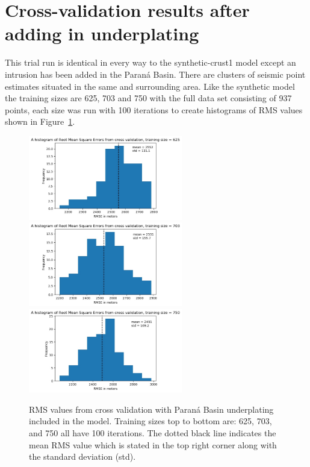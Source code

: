\section{Cross-validation results after adding in underplating}
This trial run is identical in every way to the synthetic-crust1 model except an intrusion has been added in the Paraná Basin. There are clusters of seismic point estimates situated in the same and surrounding area. Like the synthetic model the training sizes are 625, 703 and 750 with the full data set consisting of 937 points, each size was run with 100 iterations to create histograms of RMS values shown in Figure~\ref{fig:histogram_intrusion}.
\begin{figure}[h]
  \begin{center}
    \includegraphics[width=0.6\textwidth]{figures/intrusion-625}
    \includegraphics[width=0.6\textwidth]{figures/intrusion-703}
    \includegraphics[width=0.6\textwidth]{figures/intrusion-750}
  \end{center}
  \caption{
   RMS values from cross validation with Paraná Basin underplating included in the model. Training sizes top to bottom are: 625, 703, and 750 all have 100 iterations. The dotted black line indicates the mean RMS value which is stated in the top right corner along with the standard deviation (std).
  }
  \label{fig:histogram_intrusion}
\end{figure}
